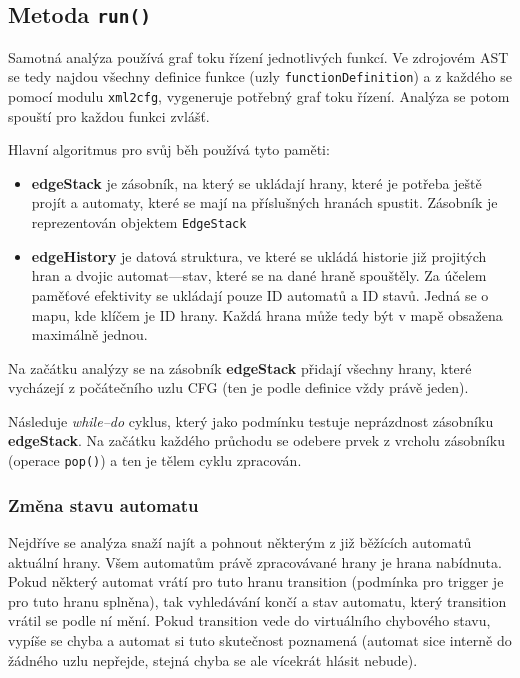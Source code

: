 \documentclass[11pt,final,oneside]{fithesis}
\begin{document}
\subsection{Metoda \texttt{run()}}
Samotná analýza používá graf toku řízení jednotlivých funkcí. Ve zdrojovém AST se tedy najdou všechny definice funkce (uzly \texttt{functionDefinition}) a z každého se pomocí modulu \texttt{xml2cfg}, vygeneruje potřebný graf toku řízení. Analýza se potom spouští pro každou funkci zvlášť.

Hlavní algoritmus pro svůj běh používá tyto paměti:
\begin{itemize}
	\item \textbf{edgeStack} je zásobník, na který se ukládají hrany, které je potřeba ještě projít a automaty, které se mají na příslušných hranách spustit. Zásobník je reprezentován objektem \texttt{EdgeStack}
	\item \textbf{edgeHistory} je datová struktura, ve které se ukládá historie již projitých hran a dvojic automat---stav, které se na dané hraně spouštěly. Za účelem paměťové efektivity se ukládají pouze ID automatů a ID stavů. Jedná se o mapu, kde klíčem je ID hrany. Každá hrana může tedy být v mapě obsažena maximálně jednou.
\end{itemize}

Na začátku analýzy se na zásobník \textbf{edgeStack} přidají všechny hrany, které vycházejí z počátečního uzlu CFG (ten je podle definice\cite{jarek} vždy právě jeden).

Následuje \textit{while--do} cyklus, který jako podmínku testuje neprázdnost zásobníku \textbf{edgeStack}. Na začátku každého průchodu se odebere prvek z vrcholu zásobníku (operace \texttt{pop()}) a ten je tělem cyklu zpracován.

\subsubsection{Změna stavu automatu}
Nejdříve se analýza snaží najít a pohnout některým z již běžících automatů aktuální hrany. Všem automatům právě zpracovávané hrany je hrana nabídnuta. Pokud některý automat vrátí pro tuto hranu transition (podmínka pro trigger je pro tuto hranu splněna), tak vyhledávání končí a stav automatu, který transition vrátil se podle ní mění. Pokud transition vede do virtuálního chybového stavu, vypíše se chyba a automat si tuto skutečnost poznamená (automat sice interně do žádného uzlu nepřejde, stejná chyba se ale vícekrát hlásit nebude).
\end{document}
